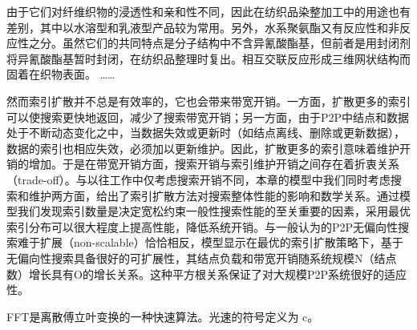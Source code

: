 由于它们对纤维织物的浸透性和亲和性不同，因此在纺织品染整加工中的用途也有差别，其中以水溶型和乳液型产品较为常用。另外，水系聚氨酯又有反应性和非反应性之分。虽然它们的共同特点是分子结构中不含异氰酸酯基，但前者是用封闭剂将异氰酸酯基暂时封闭，在纺织品整理时复出。相互交联反应形成三维网状结构而固着在织物表面。
……

然而索引扩散并不总是有效率的，它也会带来带宽开销。一方面，扩散更多的索引可以使搜索更快地返回，减少了搜索带宽开销；另一方面，由于P2P中结点和数据处于不断动态变化之中，当数据失效或更新时（如结点离线、删除或更新数据），数据的索引也相应失效，必须加以更新维护。因此，扩散更多的索引意味着维护开销的增加。于是在带宽开销方面，搜索开销与索引维护开销之间存在着折衷关系（trade-off）。与以往工作中仅考虑搜索开销不同，本章的模型中我们同时考虑搜索和维护两方面，给出了索引扩散方法对搜索整体性能的影响和数学关系。通过模型我们发现索引数量是决定宽松约束一般性搜索性能的至关重要的因素，采用最优索引分布可以很大程度上提高性能，降低系统开销。与一般认为的P2P无偏向性搜索难于扩展（non-scalable）恰恰相反，模型显示在最优的索引扩散策略下，基于无偏向性搜索具备很好的可扩展性，其结点负载和带宽开销随系统规模N（结点数）增长具有O的增长关系。这种平方根关系保证了对大规模P2P系统很好的适应性。

\gls{FFT}是离散傅立叶变换的一种快速算法。光速的符号定义为 \gls{c}。
